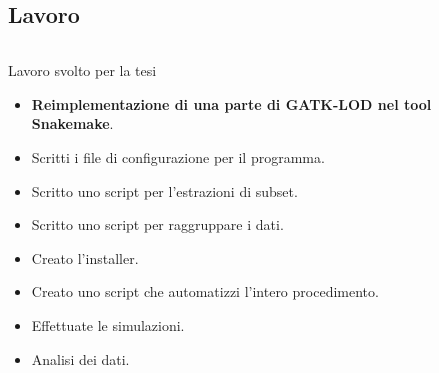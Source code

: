 \documentclass{beamer}
\begin{document}
\subsection{Lavoro}
\begin{frame}
\begin{columns}
\begin{column}{0.8\linewidth}
\begin{block}{Lavoro svolto per la tesi}
\begin{itemize}
\item \textbf{Reimplementazione di una parte di GATK-LOD nel tool Snakemake}.
\item Scritti i file di configurazione per il programma.
\item Scritto uno script per l'estrazioni di subset.
\item Scritto uno script per raggruppare i dati.
\item Creato l'installer.
\item Creato uno script che automatizzi l'intero procedimento.
\item Effettuate le simulazioni.
\item Analisi dei dati.
\end{itemize}
\end{block}
\end{column}
\end{columns}
\end{frame}

\end{document}
